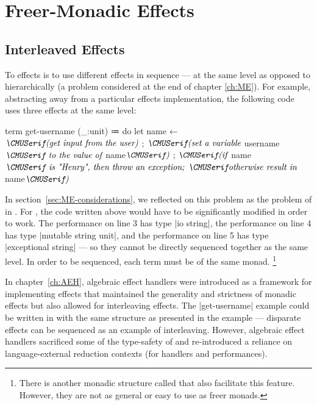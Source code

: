 \chapter{Freer-Monadic Effects}
\label{ch:FME}


\section{Interleaved Effects}

To  effects is to use different effects in sequence --- at the same level as opposed to hierarchically (a problem considered at the end of chapter \ref{ch:ME}).
For example, abstracting away from a particular effects implementation, the following code uses three effects at the same level:
%
\begin{snippet}[numbers=left]
term get-username (_:unit)
  ≔ do
      { let name ← $\normtextit{(get input from the user)}$
      ; $\normtextit{(set a variable }$username$\normtextit{ to the value of }$name$\normtextit{)}$
      ; $\normtextit{(if }$name$\normtextit{ is "Henry", then throw an exception;}$
        $\normtextit{otherwise result in }$name$\normtextit{)}$ }
\end{snippet}
%
In section~\ref{sec:ME-considerations}, we reflected on this problem as the problem of  in \LangC.
For \LangC, the code written above would have to be significantly modified in order to work.
The performance on line 3 has type \code|io string|,
the performance on line 4 has type \code|mutable string unit|, and
the performance on line 5 has type \code|exceptional string| ---
so they cannot be directly sequenced together as the same level.
In order to be sequenced, each term must be of the same monad.%
\footnote{
  There is another monadic structure called  that also facilitate this feature.
  However, they are not as general or easy to use as freer monads.
}

In chapter~\ref{ch:AEH}, algebraic effect handlers were introduced as a framework for implementing effects that maintained the generality and strictness of monadic effects but also allowed for interleaving effects.
The \code|get-username| example could be written in \LangD with the same structure as presented in the example --- disparate effects can be sequenced as an example of interleaving.
However, algebraic effect handlers sacrificed some of the type-safety of \LangC and re-introduced a reliance on language-external reduction contexts (for handlers and performances).

